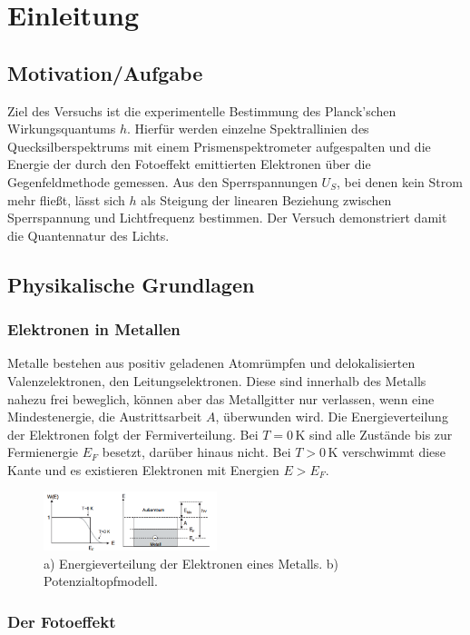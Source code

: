 \chapter{Einleitung}
\label{ch:einleitung}

\section{Motivation/Aufgabe}

Ziel des Versuchs ist die experimentelle Bestimmung des Planck'schen Wirkungsquantums $h$. Hierfür werden einzelne Spektrallinien des Quecksilberspektrums mit einem Prismenspektrometer aufgespalten und die Energie der durch den Fotoeffekt emittierten Elektronen über die Gegenfeldmethode gemessen. Aus den Sperrspannungen $U_S$, bei denen kein Strom mehr fließt, lässt sich $h$ als Steigung der linearen Beziehung zwischen Sperrspannung und Lichtfrequenz bestimmen. Der Versuch demonstriert damit die Quantennatur des Lichts.

\section{Physikalische Grundlagen}

\subsection{Elektronen in Metallen}

Metalle bestehen aus positiv geladenen Atomrümpfen und delokalisierten Valenzelektronen, den Leitungselektronen. Diese sind innerhalb des Metalls nahezu frei beweglich, können aber das Metallgitter nur verlassen, wenn eine Mindestenergie, die Austrittsarbeit $A$, überwunden wird. Die Energieverteilung der Elektronen folgt der Fermiverteilung. Bei $T=0\,\text{K}$ sind alle Zustände bis zur Fermienergie $E_F$ besetzt, darüber hinaus nicht. Bei $T>0\,\text{K}$ verschwimmt diese Kante und es existieren Elektronen mit Energien $E>E_F$.
\begin{figure}[t!]
    \includegraphics[width=0.45\textwidth]{img/35/einm.png}
    \caption{a) Energieverteilung der Elektronen eines Metalls. b) Potenzialtopfmodell.}
    \label{fig:v}
\end{figure}
\subsection{Der Fotoeffekt}


